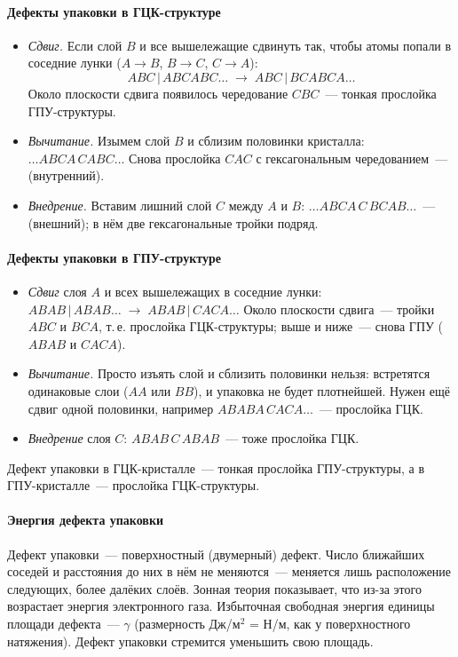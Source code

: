 \paragraph{Дефекты упаковки в ГЦК-структуре}
\begin{itemize}
\item \emph{Сдвиг.} Если слой $B$ и все вышележащие сдвинуть так, чтобы
атомы попали в соседние лунки ($A\to B$, $B\to C$, $C\to A$):
\[
ABC\,|\,ABCABC\ldots\;\longrightarrow\;ABC\,|\,BCABCA\ldots
\]
Около плоскости сдвига появилось чередование $CBC$~— тонкая прослойка
ГПУ-структуры.
\item \emph{Вычитание.} Изымем слой $B$ и сблизим половинки кристалла:
$\ldots ABCA\,CABC\ldots$ Снова прослойка $CAC$ с гексагональным
чередованием~—  (внутренний).
\item \emph{Внедрение.} Вставим лишний слой $C$ между $A$ и $B$:
$\ldots ABCA\,C\,BCAB\ldots$~— 
(внешний); в нём две гексагональные тройки подряд.
\end{itemize}

\paragraph{Дефекты упаковки в ГПУ-структуре}
\begin{itemize}
\item \emph{Сдвиг} слоя $A$ и всех вышележащих в соседние лунки:
$ABAB\,|\,ABAB\ldots\;\to\;ABAB\,|\,CACA\ldots$ Около плоскости сдвига~—
тройки $ABC$ и $BCA$, т.\,е. прослойка ГЦК-структуры; выше и ниже~— снова
ГПУ ($ABAB$ и $CACA$).
\item \emph{Вычитание.} Просто изъять слой и сблизить половинки нельзя:
встретятся одинаковые слои ($AA$ или $BB$), и упаковка не будет
плотнейшей. Нужен ещё сдвиг одной половинки, например
$ABABA\,CACA\ldots$~— прослойка ГЦК.
\item \emph{Внедрение} слоя $C$: $ABAB\,C\,ABAB$~— тоже прослойка ГЦК.
\end{itemize}

\begin{glavnoe}
Дефект упаковки в ГЦК-кристалле~— тонкая прослойка ГПУ-структуры, а в
ГПУ-кристалле~— прослойка ГЦК-структуры.
\end{glavnoe}

\paragraph{Энергия дефекта упаковки}
Дефект упаковки~— поверхностный (двумерный) дефект. Число ближайших
соседей и расстояния до них в нём не меняются~— меняется лишь
расположение следующих, более далёких слоёв. Зонная теория показывает,
что из-за этого возрастает энергия электронного газа. Избыточная
свободная энергия единицы площади дефекта~— 
$\gamma$ (размерность Дж/м$^2$ = Н/м, как у поверхностного натяжения).
Дефект упаковки стремится уменьшить свою площадь.

